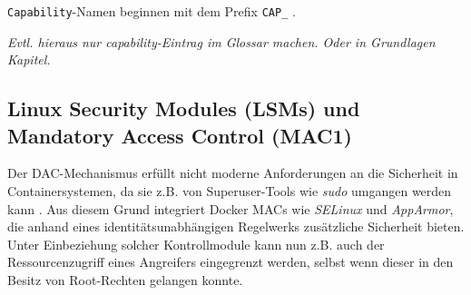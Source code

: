 \documentclass[../main.tex]{subfiles}
\begin{document}
			\texttt{Capability}-Namen beginnen mit dem Prefix \texttt{CAP\_} \cite[S.33,S.797]{linuxInterface}.



			\emph{Evtl. hieraus nur capability-Eintrag im Glossar machen. Oder in Grundlagen Kapitel.}


    \subsection{Linux Security Modules (\acrshort{LSM}s) und Mandatory Access Control (\acrshort{MAC1})}
			Der DAC-Mechanismus erfüllt nicht moderne Anforderungen an die Sicherheit in Containersystemen, da sie z.B. von Superuser-Tools wie \emph{sudo} umgangen werden kann \cite[S.1]{LSMFramework}. Aus diesem Grund integriert Docker MACs wie \emph{SELinux} und \emph{AppArmor}, die anhand eines identitätsunabhängigen Regelwerks zusätzliche Sicherheit bieten. Unter Einbeziehung solcher Kontrollmodule kann nun z.B. auch der Ressourcenzugriff eines Angreifers eingegrenzt werden, selbst wenn dieser in den Besitz von Root-Rechten gelangen konnte.
\end{document}
